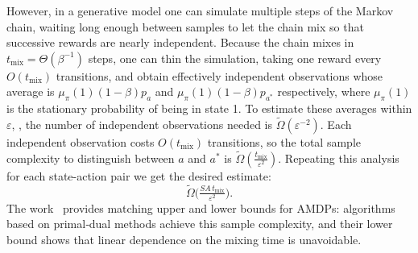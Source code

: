\documentclass{article}
\numberwithin{equation}{section}
\renewcommand{\epsilon}{\varepsilon}
\begin{document}
{However, in a generative model one can simulate multiple steps of the Markov chain, waiting long enough between samples to let the chain mix so that successive rewards are nearly independent. Because the chain mixes in $t_{\mathrm{mix}} = \Theta\left(\beta^{-1}\right)$ steps, one can thin the simulation, taking one reward every $O\left(t_{\mathrm{mix}}\right)$ transitions, and obtain effectively independent observations whose average is $\mu_{\pi}(1)(1 - \beta)p_{a}$ and $\mu_{\pi}(1)(1 - \beta)p_{a^*}$ respectively, where $\mu_{\pi}(1)$ is the stationary probability of being in state 1. To estimate these averages within $\epsilon$, , the number of independent observations needed is $\widetilde{\Omega}\left(\epsilon^{-2}\right)$. Each independent observation costs $O(t_{\mathrm{mix}})$ transitions, so the total sample complexity to distinguish between $a$ and $a^*$ is $\widetilde{\Omega}\left(\frac{t_{\mathrm{mix}}}{\epsilon^2}\right)$. Repeating this analysis for each state-action pair we get the desired estimate:
$$\widetilde{\Omega}\bigl(\tfrac{SA\,t_{\mathrm{mix}}}{\epsilon^{2}}\bigr).$$
The work~\cite{jin2021towards} provides matching upper and lower bounds for AMDPs: algorithms based on primal‑dual methods achieve this sample complexity, and their lower bound shows that linear dependence on the mixing time is unavoidable.}
\end{document}
